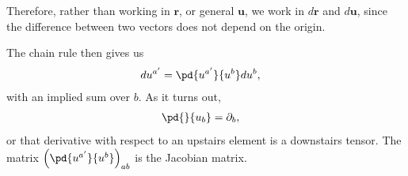\documentclass[10pt]{mypackage}
\begin{document}
  Therefore, rather than working in $\mathbf{r}$, or general $\mathbf{u}$, we work in $d\mathbf{r}$ and $d\mathbf{u}$, since the difference between two vectors does not depend on the origin.\newline

  The chain rule then gives us
  \begin{align*}
    du^{a'} &= \pd{u^{a'}}{u^{b}}du^{b},
  \end{align*}
  with an implied sum over $b$. As it turns out,
  \begin{align*}
    \pd{}{u_b} &= \partial_{b},
  \end{align*}
  or that derivative with respect to an upstairs element is a downstairs tensor. The matrix $\left( \pd{u^{a'}}{u^{b}} \right)_{ab}$ is the Jacobian matrix.\newline
\end{document}
